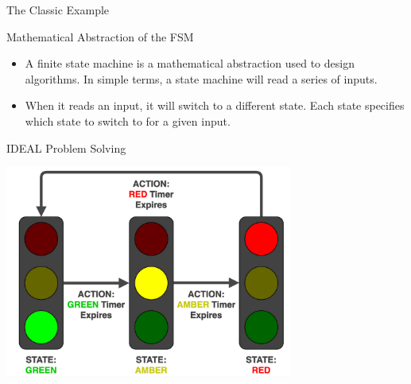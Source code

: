 \documentclass[10pt]{beamer}
\begin{document}

\begin{frame}{The Classic Example}
  

\end{frame}


\begin{frame}{Mathematical Abstraction of the FSM}
\begin{itemize}
\item A finite state machine is a mathematical abstraction used to design algorithms. In simple terms, a state machine will read a series of inputs.
\item When it reads an input, it will switch to a different state. Each state specifies which state to switch to for a given input.
\end{itemize}
\end{frame}

\begin{frame}{IDEAL Problem Solving}
\begin{center}
    	 \includegraphics[height=7cm]{images/traffic}
\end{center}
\end{frame}
\end{document}
